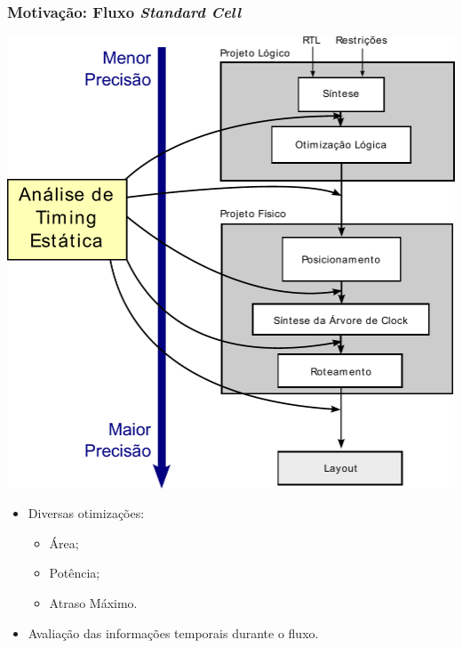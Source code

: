 \documentclass[10pt,a4paper]{beamer}
\begin{document}
		
			\begin{frame}
				\frametitle{Motivação: Fluxo \textit{Standard Cell}}
				\begin{minipage}{0.5 \textwidth}
					\includegraphics[width=\textwidth]{img/fluxo_standard_cell_sta_destacada.pdf}
				\end{minipage}
				\begin{minipage}{0.4 \textwidth}
					\begin{itemize}
						\item Diversas otimizações:
							\begin{itemize}
								\item Área;
								\item Potência;
								\item Atraso Máximo.
								
							\end{itemize}
						\item Avaliação das informações temporais durante o fluxo.
					\end{itemize}
				\end{minipage}
				
			\end{frame}
		
\end{document}
